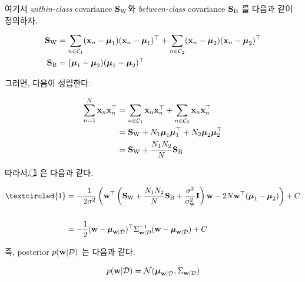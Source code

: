 \documentclass{article} %
\begin{document}
여기서 \textit{within-class} covariance ${\bf S}_{\rm W}$와 \textit{between-class} covariance ${\bf S}_{\rm B}$ 를 다음과 같이 정의하자.

\begin{equation}
\begin{aligned}
	{\bf S}_{\rm W} &= \sum_{n \in {\cal C}_1} ({\bf x}_n - \boldsymbol{\mu}_1) ({\bf x}_n - \boldsymbol{\mu}_1)^\top +  \sum_{n \in {\cal C}_2} ({\bf x}_n - \boldsymbol{\mu}_2) ({\bf x}_n - \boldsymbol{\mu}_2)^\top \\
	{\bf S}_{\rm B} &= (\boldsymbol{\mu}_1 - \boldsymbol{\mu}_2)(\boldsymbol{\mu}_1 - \boldsymbol{\mu}_2)^\top
\end{aligned}
\end{equation}

그러면, 다음이 성립한다.

\begin{equation}
\begin{aligned}
	\sum_{n = 1}^N {\bf x}_n {\bf x}_n ^\top &= \sum_{n \in {\cal C}_1} {\bf x}_n {\bf x}_n^\top + \sum_{n \in {\cal C}_2} {\bf x}_n {\bf x}_n^\top \\
	&= {\bf S}_{\rm W} + N_1 \boldsymbol{\mu}_1 \boldsymbol{\mu}_1^\top + N_2 \boldsymbol{\mu}_2 \boldsymbol{\mu}_2^\top \\
	&= {\bf S}_{\rm W} + \frac{N_1 N_2}{N} {\bf S}_{\rm B} 
\end{aligned}
\end{equation}

따라서, \textcircled{\scriptsize 1} 은 다음과 같다.

\begin{equation}
\begin{aligned}
	\textcircled{\scriptsize 1} &= -\frac{1}{2\sigma^2} \left(
		{\bf w}^\top \left( {\bf S}_{\rm W} + \frac{N_1 N_2}{N} {\bf S}_{\rm B} + \frac{\sigma^2}{\sigma_{\bf w}^2}{\bf I} \right)
		{\bf w} - 2N{\bf w}^\top (\boldsymbol{\mu}_1 - \boldsymbol{\mu}_2)
	\right)  + C 
	\\\\
	&= -\frac{1}{2} ({\bf w} - \boldsymbol{\mu}_{{\bf w}|{\cal D}})^\top \Sigma_{{\bf w}|{\cal D}}^{-1} ({\bf w} - \boldsymbol{\mu}_{{\bf w}|{\cal D}}) + C
\end{aligned}
\end{equation}

즉, posterior $p({\bf w} | {\cal D})$ 는 다음과 같다.

\begin{equation}
	p({\bf w} | {\cal D}) = {\cal N} (\boldsymbol{\mu}_{{\bf w}|{\cal D}}, \Sigma_{{\bf w}|{\cal D}})
\end{equation}
\end{document}
